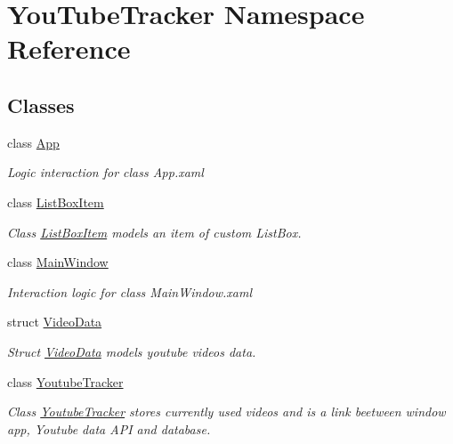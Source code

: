 \hypertarget{namespace_you_tube_tracker}{}\section{You\+Tube\+Tracker Namespace Reference}
\label{namespace_you_tube_tracker}
\subsection*{Classes}
\begin{DoxyCompactItemize}
\item 
class \mbox{\hyperlink{class_you_tube_tracker_1_1_app}{App}}
\begin{DoxyCompactList}\small\item\em Logic interaction for class App.\+xaml \end{DoxyCompactList}\item 
class \mbox{\hyperlink{class_you_tube_tracker_1_1_list_box_item}{List\+Box\+Item}}
\begin{DoxyCompactList}\small\item\em Class {\ttfamily \mbox{\hyperlink{class_you_tube_tracker_1_1_list_box_item}{List\+Box\+Item}}} models an item of custom List\+Box. \end{DoxyCompactList}\item 
class \mbox{\hyperlink{class_you_tube_tracker_1_1_main_window}{Main\+Window}}
\begin{DoxyCompactList}\small\item\em Interaction logic for class Main\+Window.\+xaml \end{DoxyCompactList}\item 
struct \mbox{\hyperlink{struct_you_tube_tracker_1_1_video_data}{Video\+Data}}
\begin{DoxyCompactList}\small\item\em Struct {\ttfamily \mbox{\hyperlink{struct_you_tube_tracker_1_1_video_data}{Video\+Data}}} models youtube video\textquotesingle{}s data. \end{DoxyCompactList}\item 
class \mbox{\hyperlink{class_you_tube_tracker_1_1_youtube_tracker}{Youtube\+Tracker}}
\begin{DoxyCompactList}\small\item\em Class {\ttfamily \mbox{\hyperlink{class_you_tube_tracker_1_1_youtube_tracker}{Youtube\+Tracker}}} stores currently used videos and is a link beetween window app, Youtube data A\+PI and database. \end{DoxyCompactList}\end{DoxyCompactItemize}

